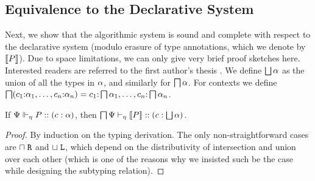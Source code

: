 \documentclass[submission,copyright,creativecommons]{eptcs}
\renewcommand{\intersect}{\mathrel{\sqcap}}
\renewcommand{\union}{\mathrel{\sqcup}}
\newcommand{\m}[1]{\mathsf{#1}}
\begin{document}


\subsection{Equivalence to the Declarative System}

Next, we show that the algorithmic system is sound and complete with respect to the declarative system (modulo erasure of type annotations, which we denote by $\left \llbracket {P} \right \rrbracket$). Due to space limitations, we can only give very brief proof sketches here. Interested readers are referred to the first author's thesis \cite{Acay16}.  We define $\operatorname{\bigsqcup}\alpha$ as the union of all the types in $\alpha$, and similarly for $\operatorname{\bigsqcap}\alpha$.  For contexts
we define $\operatorname{\bigsqcap}(c_1{:}\alpha_1, \ldots, c_n{:}\alpha_n) = c_1{:}\operatorname{\bigsqcap}\alpha_1, \ldots, c_n{:}\operatorname{\bigsqcap}\alpha_n$.

\begin{theorem}
  If ${\Psi} \Vdash_{\eta} P :: (c : \alpha)$, then ${\operatorname{\bigsqcap}\Psi} \vdash_{\eta} \left \llbracket {P} \right \rrbracket :: (c : \operatorname{\bigsqcup} \alpha)$.
\end{theorem}
\begin{proof}
  By induction on the typing derivation. The only non-straightforward cases are $\intersect\Right$ and $\union\Left$, which depend on the distributivity of intersection and union over each other (which is one of the reasons why we insisted such be the case while designing the subtyping relation).
\end{proof}
\end{document}
